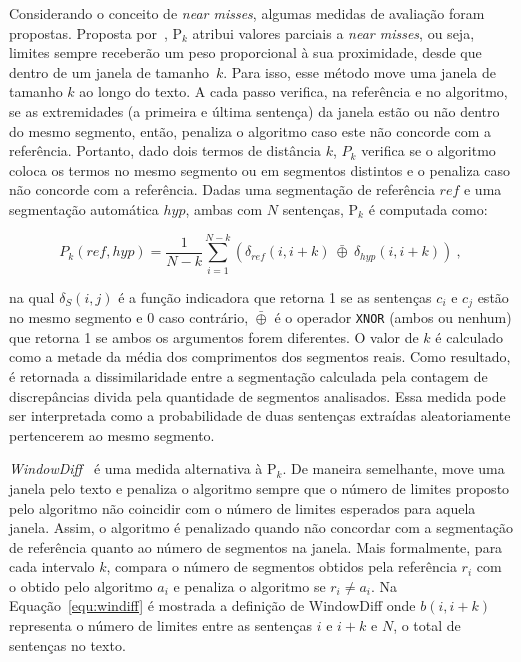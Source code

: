 
Considerando o conceito de \textit{near misses}, algumas medidas de avaliação foram propostas. Proposta por~\cite{Beeferman1999}, P$_k$ atribui valores parciais a \textit{near misses}, ou seja, limites sempre receberão um peso proporcional à sua proximidade, desde que dentro de um janela de tamanho~$k$.  Para isso, esse método move uma janela de tamanho $k$ ao longo do texto. A cada passo verifica, na referência e no algoritmo, se as extremidades (a primeira e última sentença) da janela estão ou não dentro do mesmo segmento, então, penaliza o algoritmo caso este não concorde com a referência. Portanto, dado dois termos de distância $k$, $P_k$ verifica se o algoritmo coloca os termos no mesmo segmento ou em segmentos distintos e o penaliza caso não concorde com a referência. Dadas uma segmentação de referência $ref$ e uma segmentação automática $hyp$, ambas com $N$ sentenças, P$_k$ é computada como:


\begin{equation}
P_k(ref,hyp) = \frac{1}{N - k}
\sum_{i=1}^{N-k } 
(
\delta_{ref}(i, i+k) ~
\bar{\oplus} ~
\delta_{hyp}(i, i+k) 
)~,
\label{equ:Pk}
\end{equation}

\noindent
na qual $\delta_S(i,j)$ é a função indicadora que retorna 1 se as sentenças $c_i$ e $c_j$ estão no mesmo segmento e 0 caso contrário, $\bar{\oplus}$ é o operador \texttt{XNOR} (ambos ou nenhum) que retorna 1 se ambos os argumentos forem diferentes. 
%
%
O valor de $k$ é calculado como a metade da média dos comprimentos dos segmentos reais. Como resultado, é retornada a dissimilaridade entre a segmentação calculada pela contagem de discrepâncias divida pela quantidade de segmentos analisados. Essa medida pode ser interpretada como a probabilidade de duas sentenças extraídas aleatoriamente pertencerem ao mesmo segmento.  





\textit{WindowDiff}~\cite{Pevzner2002} é uma medida alternativa à P$_k$. De maneira semelhante, move uma janela pelo texto e penaliza o algoritmo sempre que o número de limites proposto pelo algoritmo não coincidir com o número de limites esperados para aquela janela. Assim, o algoritmo é penalizado quando não concordar com a segmentação de referência quanto ao número de segmentos na janela. Mais formalmente, para cada intervalo $k$, compara o número de segmentos obtidos pela referência $r_i$ com o obtido pelo algoritmo $a_i$ e penaliza o algoritmo se $r_i \neq a_i$. Na Equação~\ref{equ:windiff} é mostrada a definição de WindowDiff onde $b(i, i+k)$ representa o número de limites entre as sentenças $i$ e $i+k$ e $N$, o total de sentenças no texto.

